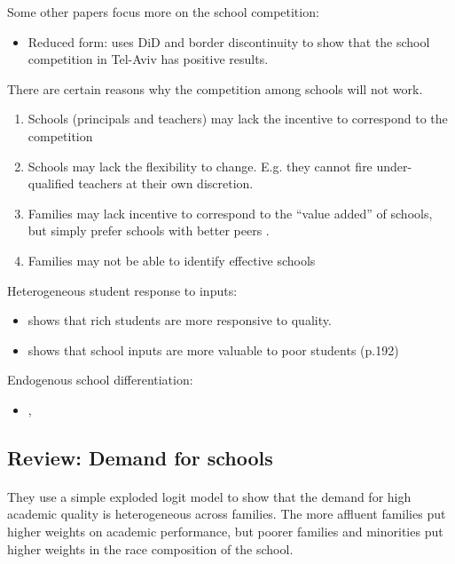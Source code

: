 Some other papers focus more on the school competition:
\begin{itemize}
    \item Reduced form: \textcite{Lavy2010} uses DiD and border discontinuity to show that the school competition in Tel-Aviv has positive results.
\end{itemize}

There are certain reasons why the competition among schools will not work.
\begin{enumerate}
    \item Schools (principals and teachers) may lack the incentive to correspond to the competition
    \item Schools may lack the flexibility to change. E.g. they cannot fire under-qualified teachers at their own discretion.
    \item Families may lack incentive to correspond to the ``value added'' of schools, but simply prefer schools with better peers \parencite{AbdulkadirogluPathakSchellenberg2017,MacLeodUrquiola2015,MacLeodUrquiola2019}.
    \item Families may not be able to identify effective schools \parencite{AllendeGallegoNeilson2018}
\end{enumerate}


Heterogeneous student response to inputs:
\begin{itemize}
    \item \textcite{Bau2019} shows that rich students are more responsive to quality.
    \item \textcite{JacksonJohnsonPersico2016} shows that school inputs are more valuable to poor students (p.192)
\end{itemize}


Endogenous school differentiation:
\begin{itemize}
    \item \textcite{MacLeodUrquiola2012}, \textcite{GilrainePetronijevicSingleton2019}
\end{itemize}



\subsection*{Review: Demand for schools}

\paragraph{\citet{HastingsKaneStaiger2009}}
They use a simple exploded logit model to show that the demand for high academic quality is heterogeneous across families.
The more affluent families put higher weights on academic performance, but poorer families and minorities put higher weights in the race composition of the school.

